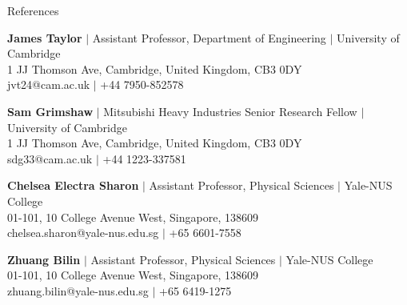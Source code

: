 \documentclass{resume} %
\begin{document}
\begin{rSection}{References}


\textbf{James Taylor} $|$ 
Assistant Professor, Department of Engineering $|$
University of Cambridge\\
1 JJ Thomson Ave, Cambridge, United Kingdom, CB3 0DY\\
jvt24@cam.ac.uk $|$ 
+44 7950-852578

\textbf{Sam Grimshaw} $|$ 
Mitsubishi Heavy Industries Senior Research Fellow $|$
University of Cambridge\\
1 JJ Thomson Ave, Cambridge, United Kingdom, CB3 0DY\\
sdg33@cam.ac.uk $|$ 
+44 1223-337581


\textbf{Chelsea Electra Sharon} $|$
Assistant Professor, Physical Sciences $|$
Yale-NUS College\\
01-101, 10 College Avenue West, Singapore, 138609\\
chelsea.sharon@yale-nus.edu.sg $|$
+65 6601-7558


\textbf{Zhuang Bilin} $|$
Assistant Professor, Physical Sciences $|$
Yale-NUS College\\
01-101, 10 College Avenue West, Singapore, 138609\\
zhuang.bilin@yale-nus.edu.sg $|$
+65 6419-1275



\end{rSection}





\let\thefootnote\relax{}
\end{document}
